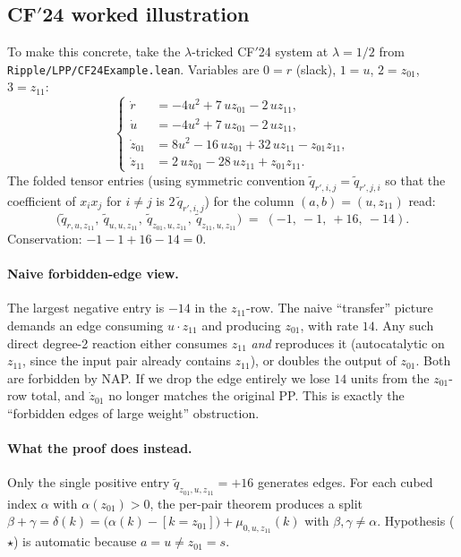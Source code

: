 \documentclass[11pt]{article}
\newcommand{\slack}{0}
\begin{document}
\subsection{CF$'$24 worked illustration}
\label{sec:cf24}

To make this concrete, take the $\lambda$-tricked CF$'$24 system at
$\lambda = 1/2$ from \texttt{Ripple/LPP/CF24Example.lean}. Variables are
$0 = r$ (slack), $1 = u$, $2 = z_{01}$, $3 = z_{11}$:
\[
\left\{
\begin{aligned}
\dot r       &= -4u^2 + 7\,u z_{01} - 2\,u z_{11}, \\
\dot u       &= -4u^2 + 7\,u z_{01} - 2\,u z_{11}, \\
\dot z_{01}  &=  8u^2 - 16\,u z_{01} + 32\,u z_{11} - z_{01} z_{11}, \\
\dot z_{11}  &=  2\,u z_{01} - 28\,u z_{11} + z_{01} z_{11}.
\end{aligned}
\right.
\]
The folded tensor entries (using symmetric convention
$\widetilde q_{r', i, j} = \widetilde q_{r', j, i}$ so that the coefficient
of $x_i x_j$ for $i \ne j$ is $2\,\widetilde q_{r', i, j}$) for the column
$(a, b) = (u, z_{11})$ read:
\[
\bigl(\widetilde q_{r, u, z_{11}},\ \widetilde q_{u, u, z_{11}},\ \widetilde q_{z_{01}, u, z_{11}},\ \widetilde q_{z_{11}, u, z_{11}}\bigr)
\;=\; (-1,\ -1,\ +16,\ -14).
\]
Conservation: $-1 - 1 + 16 - 14 = 0$. \checkmark

\paragraph{Naive forbidden-edge view.}
The largest negative entry is $-14$ in the $z_{11}$-row. The naive
``transfer'' picture demands an edge consuming $u \cdot z_{11}$ and
producing $z_{01}$, with rate $14$. Any such direct degree-2 reaction
either consumes $z_{11}$ \emph{and} reproduces it (autocatalytic on
$z_{11}$, since the input pair already contains $z_{11}$), or doubles
the output of $z_{01}$. Both are forbidden by NAP. If we drop the edge
entirely we lose $14$ units from the $z_{01}$-row total, and
$\dot z_{01}$ no longer matches the original PP. This is exactly the
``forbidden edges of large weight'' obstruction.

\paragraph{What the proof does instead.}
Only the single positive entry $\widetilde q_{z_{01}, u, z_{11}} = +16$
generates edges. For each cubed index $\alpha$ with $\alpha(z_{01}) > 0$,
the per-pair theorem produces a split
$\beta + \gamma = \delta(k) = \bigl(\alpha(k) - [k = z_{01}]\bigr) + \mu_{\slack, u, z_{11}}(k)$
with $\beta, \gamma \ne \alpha$. Hypothesis ($\star$) is automatic
because $a = u \ne z_{01} = s$.
\end{document}
